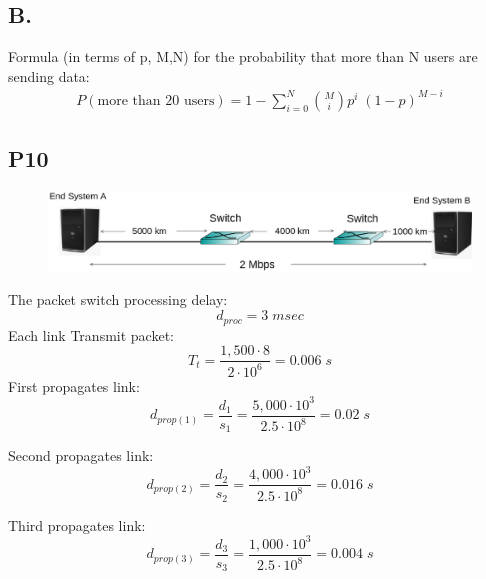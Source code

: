 \documentclass[journal]{IEEEtran}
\begin{document}
\subsection*{B.}
\hspace{0.3cm}Formula (in terms of p, M,N) for the probability that more than N users are sending data:
\begin{equation*}
  \begin{split}
    P(\text{more than 20 users}) = 1 - \sum_{i=0}^N \binom{M}{i}p^i \; (1-p)^{M-i}
  \end{split}
\end{equation*}




\subsection*{P10}
\begin{figure}[H] 
  \centering  
  \includegraphics[scale=0.25]{P10} 
  \end{figure}
The packet switch processing delay:
\begin{equation*}
  d_{proc} = 3 \; msec
\end{equation*}
\hspace*{0.3cm} Each link Transmit packet:
\begin{equation*}
  T_{t} = \frac{1,500 \cdot 8}{2 \cdot 10^6} = 0.006 \; s
\end{equation*}
\hspace*{0.3cm} First propagates link:
\begin{equation*}
  d_{prop(1)} = \frac{d_1}{s_1} = \frac{5,000 \cdot 10^3}{2.5 \cdot 10^8} = 0.02 \; s
\end{equation*}

Second propagates link:
\begin{equation*}
  d_{prop(2)} = \frac{d_2}{s_2} = \frac{4,000 \cdot 10^3}{2.5 \cdot 10^8} = 0.016 \; s
\end{equation*}

Third propagates link:
\begin{equation*}
  d_{prop(3)} = \frac{d_3}{s_3} = \frac{1,000 \cdot 10^3}{2.5 \cdot 10^8} = 0.004 \; s
\end{equation*}
\end{document}
